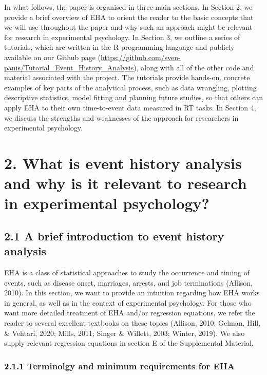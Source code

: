 \documentclass[
  man, donotrepeattitle,floatsintext]{apa6}
\begin{document}
In what follows, the paper is organised in three main sections. In Section 2, we provide a brief overview of EHA to orient the reader to the basic concepts that we will use throughout the paper and why such an approach might be relevant for research in experimental psychology. In Section 3, we outline a series of tutorials, which are written in the R programming language and publicly available on our Github page (\url{https://github.com/sven-panis/Tutorial_Event_History_Analysis}), along with all of the other code and material associated with the project. The tutorials provide hands-on, concrete examples of key parts of the analytical process, such as data wrangling, plotting descriptive statistics, model fitting and planning future studies, so that others can apply EHA to their own time-to-event data measured in RT tasks. In Section 4, we discuss the strengths and weaknesses of the approach for researchers in experimental psychology.

\section{2. What is event history analysis and why is it relevant to research in experimental psychology?}\label{what-is-event-history-analysis-and-why-is-it-relevant-to-research-in-experimental-psychology}

\subsection{2.1 A brief introduction to event history analysis}\label{a-brief-introduction-to-event-history-analysis}

EHA is a class of statistical approaches to study the occurrence and timing of events, such as disease onset, marriages, arrests, and job terminations (Allison, 2010). In this section, we want to provide an intuition regarding how EHA works in general, as well as in the context of experimental psychology. For those who want more detailed treatment of EHA and/or regression equations, we refer the reader to several excellent textbooks on these topics (Allison, 2010; Gelman, Hill, \& Vehtari, 2020; Mills, 2011; Singer \& Willett, 2003; Winter, 2019). We also supply relevant regression equations in section E of the Supplemental Material.

\subsubsection{2.1.1 Terminolgy and minimum requirements for EHA}\label{terminolgy-and-minimum-requirements-for-eha}
\end{document}
